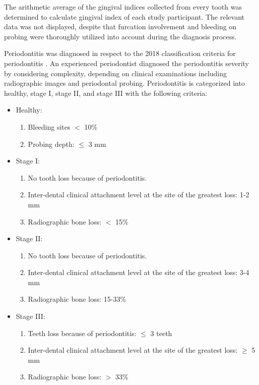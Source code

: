 \documentclass[11pt, a4paper, onecolumn, oneside]{report}
\begin{document}
                The arithmetic average of the gingival indices collected from every tooth was determined to calculate gingival index of each study participant. The relevant data was not displayed, despite that furcation involvement and bleeding on probing were thoroughly utilized into account during the diagnosis process.

                Periodontitis was diagnosed in respect to the 2018 classification criteria for periodontitis \cite{Periodontitis-4, Periodontitis-13}. An experienced periodontist diagnosed the periodontitis severity by considering complexity, depending on clinical examinations including radiographic images and periodontal probing. Periodontitis is categorized into healthy, stage I, stage II, and stage III with the following criteria:
                \begin{itemize}
                    \item Healthy:
                    \begin{enumerate}
                        \item Bleeding sites $<$ 10\%
                        \item Probing depth: $\le$ 3 mm
                    \end{enumerate}

                    \item Stage I:
                    \begin{enumerate}
                        \item No tooth loss because of periodontitis.
                        \item Inter-dental clinical attachment level at the site of the greatest loss: 1-2 mm
                        \item Radiographic bone loss: $<$ 15\%
                    \end{enumerate}

                    \item Stage II:
                    \begin{enumerate}
                        \item No tooth loss because of periodontitis.
                        \item Inter-dental clinical attachment level at the site of the greatest loss: 3-4 mm
                        \item Radiographic bone loss: 15-33\%
                    \end{enumerate}

                    \item Stage III:
                    \begin{enumerate}
                        \item Teeth loss because of periodontitis: $\le$ 3 teeth
                        \item Inter-dental clinical attachment level at the site of the greatest loss: $\ge$ 5 mm
                        \item Radiographic bone loss: $>$ 33\%
                    \end{enumerate}
                \end{itemize}
\end{document}
